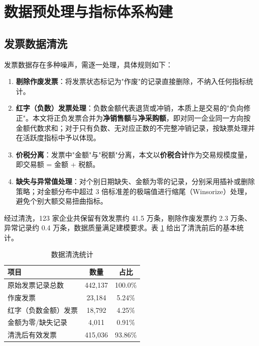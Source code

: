 \documentclass[12pt]{ctexart}
\begin{document}
\section{数据预处理与指标体系构建}

\subsection{发票数据清洗}

发票数据存在多种噪声，需逐一处理，具体规则如下：

\begin{enumerate}[label=(\arabic*),itemsep=2pt]
    \item \textbf{剔除作废发票}：将发票状态标记为"作废"的记录直接删除，不纳入任何指标统计。
    \item \textbf{红字（负数）发票处理}：负数金额代表退货或冲销，本质上是交易的"负向修正"。本文将正负发票合并为\textbf{净销售额}与\textbf{净采购额}，即对同一企业同一方向按金额代数求和；对于只有负数、无对应正数的不完整冲销记录，按缺票处理并在活跃度指标中予以体现。
    \item \textbf{价税分离}：发票中"金额"与"税额"分离，本文以\textbf{价税合计}作为交易规模度量，即交易额 = 金额 + 税额。
    \item \textbf{缺失与异常值处理}：对个别日期缺失、金额为零的记录，分别采用插补或删除策略；对金额分布中超过 3 倍标准差的极端值进行缩尾（Winsorize）处理，避免个别大额交易扭曲指标。
\end{enumerate}

经过清洗，123 家企业共保留有效发票约 41.5 万条，剔除作废发票约 2.3 万条、异常记录约 0.4 万条，数据质量满足建模要求。表 \ref{tab:clean} 给出了清洗前后的基本统计。

\begin{table}[H]
\centering
\caption{数据清洗统计}
\label{tab:clean}
\small
\begin{tabular}{lcc}
\toprule
\textbf{项目} & \textbf{数量} & \textbf{占比} \\
\midrule
原始发票记录总数 & 442{,}137 & 100.0\% \\
作废发票 & 23{,}184 & 5.24\% \\
红字（负数金额）发票 & 18{,}792 & 4.25\% \\
金额为零/缺失记录 & 4{,}011 & 0.91\% \\
清洗后有效发票 & 415{,}036 & 93.86\% \\
\bottomrule
\end{tabular}
\end{table}
\end{document}
